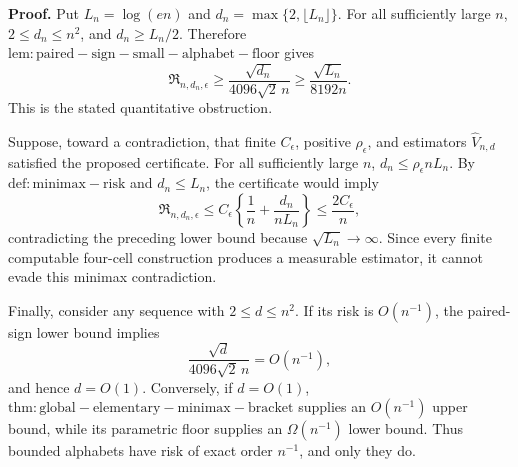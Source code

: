 \textbf{Proof.}
Put \(L_n=\log(en)\) and \(d_n=\max\{2,\lfloor L_n\rfloor\}\).  For all sufficiently large \(n\), \(2\leq d_n\leq n^2\), and \(d_n\geq L_n/2\).  Therefore \(\mathrm{lem:paired-sign-small-alphabet-floor}\) gives
\[
 \mathfrak R_{n,d_n,\epsilon}
 \geq\frac{\sqrt{d_n}}{4096\sqrt2\,n}
 \geq\frac{\sqrt{L_n}}{8192n}.
\]
This is the stated quantitative obstruction.

Suppose, toward a contradiction, that finite \(C_\epsilon\), positive \(\rho_\epsilon\), and estimators \(\widehat V_{n,d}\) satisfied the proposed certificate.  For all sufficiently large \(n\), \(d_n\leq\rho_\epsilon nL_n\).  By \(\mathrm{def:minimax-risk}\) and \(d_n\leq L_n\), the certificate would imply
\[
 \mathfrak R_{n,d_n,\epsilon}
 \leq C_\epsilon\left\{\frac1n+\frac{d_n}{nL_n}\right\}
 \leq\frac{2C_\epsilon}{n},
\]
contradicting the preceding lower bound because \(\sqrt{L_n}\to\infty\).  Since every finite computable four-cell construction produces a measurable estimator, it cannot evade this minimax contradiction.

Finally, consider any sequence with \(2\leq d\leq n^2\).  If its risk is \(O(n^{-1})\), the paired-sign lower bound implies
\[
 \frac{\sqrt d}{4096\sqrt2\,n}=O(n^{-1}),
\]
and hence \(d=O(1)\).  Conversely, if \(d=O(1)\), \(\mathrm{thm:global-elementary-minimax-bracket}\) supplies an \(O(n^{-1})\) upper bound, while its parametric floor supplies an \(\Omega(n^{-1})\) lower bound.  Thus bounded alphabets have risk of exact order \(n^{-1}\), and only they do.